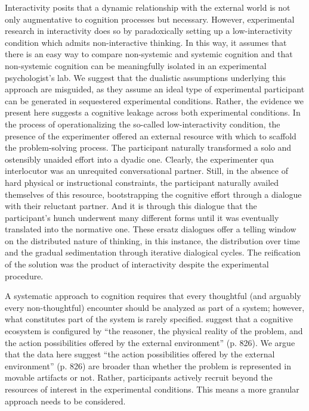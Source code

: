 {{Interactivity posits that a dynamic relationship with the external world is not only augmentative to cognition processes but necessary. However, experimental research in interactivity does so by paradoxically setting up a low-interactivity condition which admits non-interactive thinking.
In this way, it assumes that there is an easy way to compare non-systemic and systemic cognition and that non-systemic cognition can be meaningfully isolated in an experimental psychologist's lab. We suggest that the dualistic assumptions underlying this approach are misguided, as they assume an ideal type of experimental participant can be generated in sequestered experimental conditions. Rather, the evidence we present here suggests a cognitive leakage across both experimental conditions. In the process of operationalizing the so-called low-interactivity condition, the presence of the experimenter offered an external resource with which to scaffold the problem-solving process. The participant naturally transformed a solo and ostensibly unaided effort into a dyadic one. Clearly, the experimenter qua interlocutor was an unrequited conversational partner. Still, in the absence of hard physical or instructional constraints, the participant naturally availed themselves of this resource, bootstrapping the cognitive effort through a dialogue with their reluctant partner. And it is through this dialogue that the participant's hunch underwent many different forms until it was eventually translated into the normative one. These ersatz dialogues offer a telling window on the distributed nature of thinking, in this instance, the distribution over time and the gradual sedimentation through iterative dialogical cycles. The reification of the solution was the product of interactivity despite the experimental procedure.

A systematic approach to cognition requires that every thoughtful (and arguably every non-thoughtful) encounter should be analyzed as part of a system; however, what constitutes part of the system is rarely specified. \textcite{Vallée-Tourangeau2020} suggest that a cognitive ecosystem is configured by ``the reasoner, the physical reality of the problem, and the action possibilities offered by the external environment'' (p. 826). We argue that the data here suggest ``the action possibilities offered by the external environment'' (p. 826) are broader than whether the problem is represented in movable artifacts or not.
Rather, participants actively recruit beyond the resources of interest in the experimental conditions. This means a more granular approach needs to be considered.


}}
